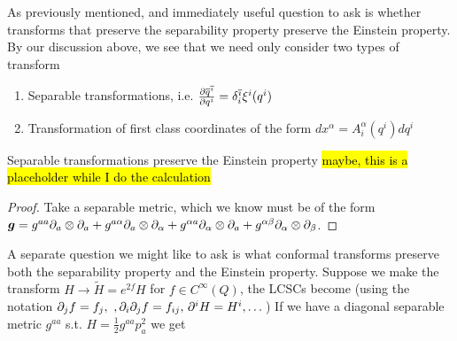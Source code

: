 \documentclass{article}
\begin{document}
As previously mentioned, and immediately useful question to ask is whether transforms that preserve the separability property preserve the Einstein property. By our discussion above, we see that we need only consider two types of transform 
\begin{enumerate}
    \item Separable transformations, i.e. $\pd[\bar{q}^{\bar{\imath}}]{q^i} = \delta_i^{\bar{\imath}}\xi^i(q^i)$
    \item Transformation of first class coordinates of the form $dx^\alpha = A^\alpha_i(q^i) dq^i $
\end{enumerate}

\begin{prop}
Separable transformations preserve the Einstein property \hl{maybe, this is a placeholder while I do the calculation}
\end{prop}
\begin{proof}
Take a separable metric, which we know must be of the form $\bm{g} = g^{aa} \del_a \otimes \del_a + g^{a\alpha}\del_a \otimes \del_\alpha + g^{\alpha a}\del_\alpha \otimes \del_a + g^{\alpha\beta} \del_\alpha \otimes \del_\beta$.  
\end{proof}


A separate question we might like to ask is what conformal transforms preserve both the separability property and the Einstein property. Suppose we make the transform $H \to \tilde{H} = e^{2f}H$ for $f \in C^\infty(Q)$, the LCSCs become (using the notation $\del_j f = f_{j}, \ ,\del_i\del_j f = f_{ij}, \, \del^iH = H^i, \dots$)
If we have a diagonal separable metric $g^{aa}$ s.t. $H = \frac{1}{2} g^{aa} p_a^2$ we get 

\end{document}
